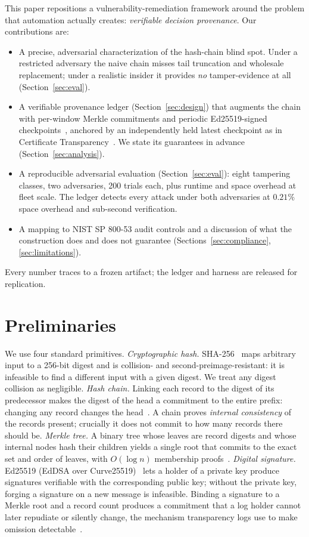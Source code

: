\documentclass[journal]{IEEEtran}
\begin{document}
This paper repositions a vulnerability-remediation framework around the
problem that automation actually creates: \emph{verifiable decision
provenance}. Our contributions are:
\begin{itemize}
\item A precise, adversarial characterization of the hash-chain blind spot.
Under a restricted adversary the naive chain misses tail truncation and
wholesale replacement; under a realistic insider it provides \emph{no}
tamper-evidence at all (Section~\ref{sec:eval}).
\item A verifiable provenance ledger (Section~\ref{sec:design}) that
augments the chain with per-window Merkle commitments and periodic
Ed25519-signed checkpoints~\cite{merkle1980protocols,rfc8032}, anchored by an
independently held latest checkpoint as in Certificate
Transparency~\cite{rfc6962,crosby2009tamper}. We state its guarantees in
advance (Section~\ref{sec:analysis}).
\item A reproducible adversarial evaluation (Section~\ref{sec:eval}): eight
tampering classes, two adversaries, 200 trials each, plus runtime and space
overhead at fleet scale. The ledger detects every attack under both
adversaries at $0.21\%$ space overhead and sub-second verification.
\item A mapping to NIST SP 800-53 audit controls and a discussion of what
the construction does and does not guarantee (Sections~\ref{sec:compliance},
\ref{sec:limitations}).
\end{itemize}
Every number traces to a frozen artifact; the ledger and harness are
released for replication.

\section{Preliminaries}
\label{sec:prelim}
We use four standard primitives.
\emph{Cryptographic hash.} SHA-256~\cite{fips180-4} maps arbitrary input to a
256-bit digest and is collision- and second-preimage-resistant: it is
infeasible to find a different input with a given digest. We treat any digest
collision as negligible.
\emph{Hash chain.} Linking each record to the digest of its predecessor makes
the digest of the head a commitment to the entire prefix: changing any record
changes the head~\cite{haber1991timestamp,schneier1999secure}. A chain proves
\emph{internal consistency} of the records present; crucially it does not
commit to how many records there should be.
\emph{Merkle tree.} A binary tree whose leaves are record digests and whose
internal nodes hash their children yields a single root that commits to the
exact set and order of leaves, with $O(\log n)$ membership
proofs~\cite{merkle1980protocols,crosby2009tamper}.
\emph{Digital signature.} Ed25519 (EdDSA over Curve25519)~\cite{rfc8032} lets
a holder of a private key produce signatures verifiable with the
corresponding public key; without the private key, forging a signature on a
new message is infeasible. Binding a signature to a Merkle root and a record
count produces a commitment that a log holder cannot later repudiate or
silently change, the mechanism transparency logs use to make omission
detectable~\cite{rfc6962}.
\end{document}
